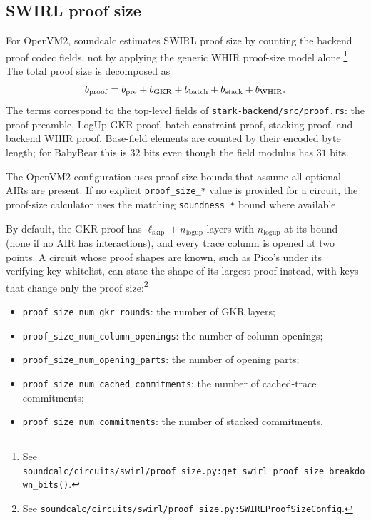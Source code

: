 \subsection{SWIRL proof size}

For OpenVM2, soundcalc estimates SWIRL proof size by counting the backend proof
codec fields, not by applying the generic WHIR proof-size model alone.\footnote{See
\texttt{soundcalc/circuits/swirl/proof\_size.py:get\_swirl\_proof\_size\_breakdown\_bits()}.}
The total proof size is decomposed as
\[
b_{\mathrm{proof}} =
b_{\mathrm{pre}} + b_{\mathrm{GKR}} + b_{\mathrm{batch}}
+ b_{\mathrm{stack}} + b_{\mathrm{WHIR}}.
\]
The terms correspond to the top-level fields of
\texttt{stark-backend/src/proof.rs}: the proof preamble, LogUp GKR proof,
batch-constraint proof, stacking proof, and backend WHIR proof. Base-field
elements are counted by their encoded byte length; for BabyBear this is
\(32\) bits even though the field modulus has \(31\) bits.

The OpenVM2 configuration uses proof-size bounds that assume all optional AIRs
are present. If no explicit \texttt{proof\_size\_*} value is provided for a
circuit, the proof-size calculator uses the matching \texttt{soundness\_*}
bound where available.

By default, the GKR proof has \(\ell_{\mathrm{skip}} + n_{\mathrm{logup}}\) layers
with \(n_{\mathrm{logup}}\) at its bound (none if no AIR has interactions), and
every trace column is opened at two points. A circuit whose proof shapes are
known, such as Pico's under its verifying-key whitelist, can state the shape of
its largest proof instead, with keys that change only the proof
size:\footnote{See
\texttt{soundcalc/circuits/swirl/proof\_size.py:SWIRLProofSizeConfig}.}
\begin{itemize}
  \item \texttt{proof\_size\_num\_gkr\_rounds}: the number of GKR layers;
  \item \texttt{proof\_size\_num\_column\_openings}: the number of column openings;
  \item \texttt{proof\_size\_num\_opening\_parts}: the number of opening parts;
  \item \texttt{proof\_size\_num\_cached\_commitments}: the number of cached-trace
    commitments;
  \item \texttt{proof\_size\_num\_commitments}: the number of stacked commitments.
\end{itemize}
